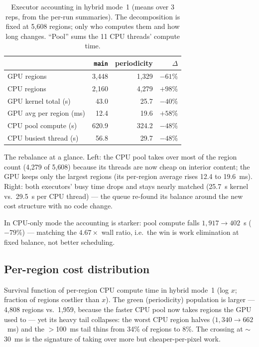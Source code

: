 \documentclass[
	english,
	letterpaper, oneside
]{article}
\begin{document}
\begin{table}[H]
\centering
\caption{Executor accounting in hybrid mode~1 (means over 3 reps, from the
per-run summaries). The decomposition is fixed at 5{,}608 regions; only who
computes them and how long changes. ``Pool'' sums the 11 CPU threads'
compute time.\label{tab:split}}
\begin{tabular}{lrrr}
\toprule
 & \texttt{main} & periodicity & $\Delta$ \\
\midrule
GPU regions               & 3{,}448 & 1{,}329 & $-61\%$ \\
CPU regions               & 2{,}160 & 4{,}279 & $+98\%$ \\
GPU kernel total (s)      & 43.0    & 25.7    & $-40\%$ \\
GPU avg per region (ms)   & 12.4    & 19.6    & $+58\%$ \\
CPU pool compute (s)      & 620.9   & 324.2   & $-48\%$ \\
CPU busiest thread (s)    & 56.8    & 29.7    & $-48\%$ \\
\bottomrule
\end{tabular}
\end{table}

            {The rebalance at a glance. Left: the CPU pool takes over most of
             the region count (4{,}279 of 5{,}608) because its threads are now
             cheap on interior content; the GPU keeps only the largest
             regions (its per-region average rises 12.4 to 19.6~ms).
             Right: both executors' busy time drops and stays nearly matched
             (25.7~s kernel vs.\ 29.5~s per CPU thread) --- the queue
             re-found its balance around the new cost structure with no code
             change. \label{fig:split}}

In CPU-only mode the accounting is starker: pool compute falls
$1{,}917 \to 402$~s ($-79\%$) --- matching the $4.67\times$ wall ratio, i.e.\
the win is work elimination at fixed balance, not better scheduling.

\subsection{Per-region cost distribution}

            {Survival function of per-region CPU compute time in hybrid
             mode~1 (log $x$; fraction of regions costlier than $x$).
             The green (periodicity) population is larger --- 4{,}808
             regions vs.\ 1{,}959, because the faster CPU pool now takes
             regions the GPU used to --- yet its heavy tail collapses: the
             worst CPU region halves ($1{,}340 \to 662$~ms) and the
             $>$100~ms tail thins from 34\% of regions to 8\%. The
             crossing at $\sim$30~ms is the signature of taking over
             more but cheaper-per-pixel work.\label{fig:dist}}
\end{document}
